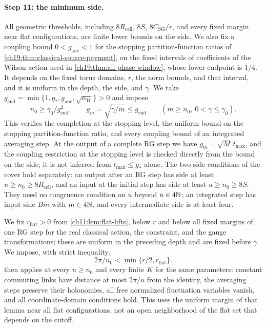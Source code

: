 \paragraph{Step 11: the minimum side.}
All geometric thresholds, including $8R_{\mathrm{cell}}$, $8S$, $8C_{\mathrm{SG}}/r$, and every fixed margin near flat configurations, are finite lower bounds on the side. We also fix a coupling bound $0<g_{\mathrm{anc}}<1$ for the stopping partition-function ratios of \cref{ch19:thm:classical-source-payment}, on the fixed intervals of coefficients of the Wilson action used in \cref{ch19:thm:all-phase-window}, whose lower endpoint is $1/4$. It depends on the fixed torus domains, $r$, the norm bounds, and that interval, and it is uniform in the depth, the side, and $\gamma$. We take $g_{\mathrm{end}}=\min\{1,g_*,g_{\mathrm{anc}},\sqrt{\alpha_W}\}>0$ and impose
\begin{equation}\label{ch20:eq:endpoint-coupling-gate}
 n_0\ge\gamma_0/g_{\mathrm{end}}^2,\qquad g_m=\sqrt{\gamma/m}\le g_{\mathrm{end}}\qquad(m\ge n_0,\ 0<\gamma\le\gamma_0).
\end{equation}
This verifies the completion at the stopping level, the uniform bound on the stopping partition-function ratio, and every coupling bound of an integrated averaging step. At the output of a complete RG step we have $g_m=\sqrt M\,t_{\max}$, and the coupling restriction at the stopping level is checked directly from the bound on the side; it is not inferred from $t_{\max}\le g_*$ alone. The two side conditions of the cover hold separately: an output after an RG step has side at least $u\ge n_0\ge8R_{\mathrm{cell}}$, and an input at the initial step has side at least $u\ge n_0\ge8S$. They need no congruence condition on $u$ beyond $u\in4\mathbb N$; an integrated step has input side $Bm$ with $m\in4\mathbb N$, and every intermediate side is at least four.

We fix $r_{\mathrm{flat}}>0$ from \cref{ch11:lem:flat-lifts}, below $r$ and below all fixed margins of one RG step for the real classical action, the constraint, and the gauge transformations; these are uniform in the preceding depth and are fixed before $\gamma$. We impose, with strict inequality,
\begin{equation}\label{ch20:eq:whole-flat-side}
 2\pi/n_0<\min\{r/2,r_{\mathrm{flat}}\}.
\end{equation}
 then applies at every $u\ge n_0$ and every finite $K$ for the same parameters: constant commuting links have distance at most $2\pi/u$ from the identity, the averaging steps preserve their holonomies, all free normalized fluctuation variables vanish, and all coordinate-domain conditions hold. This uses the uniform margin of that lemma near all flat configurations, not an open neighborhood of the flat set that depends on the cutoff.

